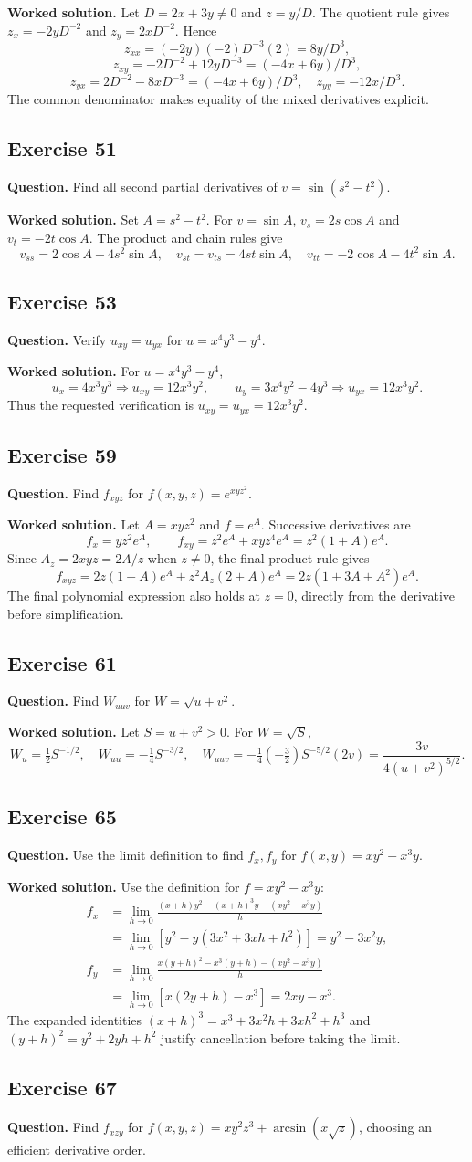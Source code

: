 \documentclass[11pt]{article}
\newcommand{\ex}[1]{\Needspace{8\baselineskip}\subsection*{Exercise #1}}
\newcommand{\ans}[1]{\boxed{#1}}
\begin{document}
\textbf{Worked solution.}
Let $D=2x+3y\ne0$ and $z=y/D$. The quotient rule gives $z_x=-2yD^{-2}$ and $z_y=2xD^{-2}$. Hence
\[z_{xx}=(-2y)(-2)D^{-3}(2)=\ans{8y/D^3},\]
\[z_{xy}=-2D^{-2}+12yD^{-3}=\ans{(-4x+6y)/D^3},\]
\[z_{yx}=2D^{-2}-8xD^{-3}=\ans{(-4x+6y)/D^3},\quad\ans{z_{yy}=-12x/D^3}.\]
The common denominator makes equality of the mixed derivatives explicit.
\ex{51}
\textbf{Question.} Find all second partial derivatives of $v=\sin(s^2-t^2)$.

\textbf{Worked solution.}
Set $A=s^2-t^2$. For $v=\sin A$, $v_s=2s\cos A$ and $v_t=-2t\cos A$. The product and chain rules give
\[\ans{v_{ss}=2\cos A-4s^2\sin A},\quad\ans{v_{st}=v_{ts}=4st\sin A},\quad\ans{v_{tt}=-2\cos A-4t^2\sin A}.\]
\ex{53}
\textbf{Question.} Verify $u_{xy}=u_{yx}$ for $u=x^4y^3-y^4$.

\textbf{Worked solution.}
For $u=x^4y^3-y^4$,
\[u_x=4x^3y^3\Rightarrow u_{xy}=12x^3y^2,\qquad
u_y=3x^4y^2-4y^3\Rightarrow u_{yx}=12x^3y^2.\]
Thus the requested verification is $\ans{u_{xy}=u_{yx}=12x^3y^2}$.
\ex{59}
\textbf{Question.} Find $f_{xyz}$ for $f(x,y,z)=e^{xyz^2}$.

\textbf{Worked solution.}
Let $A=xyz^2$ and $f=e^A$. Successive derivatives are
\[f_x=yz^2e^A,\qquad f_{xy}=z^2e^A+xyz^4e^A=z^2(1+A)e^A.\]
Since $A_z=2xyz=2A/z$ when $z\ne0$, the final product rule gives
\[f_{xyz}=2z(1+A)e^A+z^2 A_z(2+A)e^A
=\ans{2z(1+3A+A^2)e^A}.\]
The final polynomial expression also holds at $z=0$, directly from the derivative before simplification.
\ex{61}
\textbf{Question.} Find $W_{uuv}$ for $W=\sqrt{u+v^2}$.

\textbf{Worked solution.}
Let $S=u+v^2>0$. For $W=\sqrt S$,
\[W_u=\tfrac12S^{-1/2},\quad W_{uu}=-\tfrac14S^{-3/2},\quad
W_{uuv}=-\tfrac14(-\tfrac32)S^{-5/2}(2v)=\ans{\frac{3v}{4(u+v^2)^{5/2}}}.\]
\ex{65}
\textbf{Question.} Use the limit definition to find $f_x,f_y$ for $f(x,y)=xy^2-x^3y$.

\textbf{Worked solution.}
Use the definition for $f=xy^2-x^3y$:
\begin{align*}
f_x&=\lim_{h\to0}\frac{(x+h)y^2-(x+h)^3y-(xy^2-x^3y)}h\\
&=\lim_{h\to0}\left[y^2-y(3x^2+3xh+h^2)\right]=\ans{y^2-3x^2y},\\
f_y&=\lim_{h\to0}\frac{x(y+h)^2-x^3(y+h)-(xy^2-x^3y)}h\\
&=\lim_{h\to0}\left[x(2y+h)-x^3\right]=\ans{2xy-x^3}.
\end{align*}
The expanded identities $(x+h)^3=x^3+3x^2h+3xh^2+h^3$ and $(y+h)^2=y^2+2yh+h^2$ justify cancellation before taking the limit.
\ex{67}
\textbf{Question.} Find $f_{xzy}$ for $f(x,y,z)=xy^2z^3+\arcsin(x\sqrt z)$, choosing an efficient derivative order.
\end{document}
